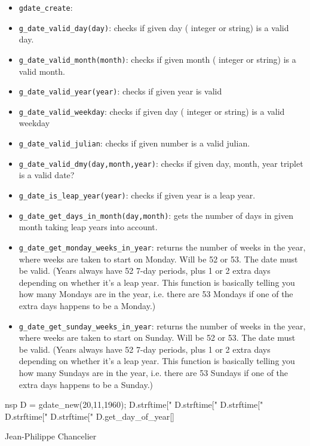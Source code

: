 \begin{itemize}
  \item \verb+gdate_create+:
  \item \verb+g_date_valid_day(day)+: checks if given day ( integer or string) is a valid day.
  \item \verb+g_date_valid_month(month)+: checks if given month ( integer or string) is a valid month.
  \item \verb+g_date_valid_year(year)+: checks if given year is valid 
  \item \verb+g_date_valid_weekday+: checks if given day ( integer or string) is a valid weekday 
  \item \verb+g_date_valid_julian+: checks if given number  is a valid julian.
  \item \verb+g_date_valid_dmy(day,month,year)+: checks if given day, month, year triplet is a valid date?
  \item \verb+g_date_is_leap_year(year)+: checks if given year is a leap year.
  \item \verb+g_date_get_days_in_month(day,month)+: gets the number of days in given month taking leap years into account.
  \item \verb+g_date_get_monday_weeks_in_year+: returns the number of weeks in the year, where weeks are taken to start on Monday. Will be 52 or 53. The date must be valid. (Years always have 52 7-day periods, plus 1 or 2 extra days depending on whether it's a leap year. This function is basically telling you how many Mondays are in the year, i.e. there are 53 Mondays if one of the extra days happens to be a Monday.)
  \item \verb+g_date_get_sunday_weeks_in_year+: returns the number of weeks in the year, where weeks are taken to start on Sunday. Will be 52 or 53. The date must be valid. (Years always have 52 7-day periods, plus 1 or 2 extra days depending on whether it's a leap year. This function is basically telling you how many Sundays are in the year, i.e. there are 53 Sundays if one of the extra days happens to be a Sunday.)
\end{itemize}

\begin{examples}
\begin{mintednsp}{nsp}
D = gdate_new(20,11,1960);
D.strftime["%
D.strftime["%
D.strftime["%
D.strftime["%
D.strftime["%
D.get_day_of_year[]
\end{mintednsp}
\end{examples}

\begin{authors}
  Jean-Philippe Chancelier
\end{authors}
